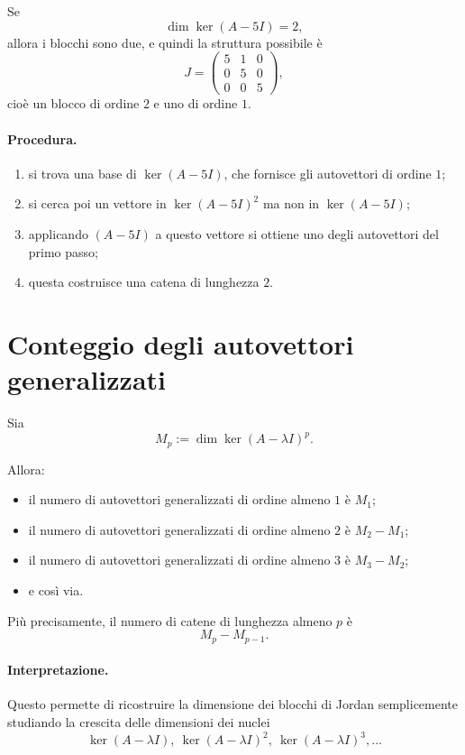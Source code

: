 Se
\[
\dim\ker(A-5I)=2,
\]
allora i blocchi sono due, e quindi la struttura possibile è
\[
J=
\begin{pmatrix}
5 & 1 & 0\\
0 & 5 & 0\\
0 & 0 & 5
\end{pmatrix},
\]
cioè un blocco di ordine $2$ e uno di ordine $1$.

\paragraph{Procedura.}
\begin{enumerate}
    \item si trova una base di $\ker(A-5I)$, che fornisce gli autovettori di ordine $1$;
    \item si cerca poi un vettore in $\ker(A-5I)^2$ ma non in $\ker(A-5I)$;
    \item applicando $(A-5I)$ a questo vettore si ottiene uno degli autovettori del primo passo;
    \item questa costruisce una catena di lunghezza $2$.
\end{enumerate}

\section{Conteggio degli autovettori generalizzati}

Sia
\[
M_p:=\dim\ker(A-\lambda I)^p.
\]

Allora:
\begin{itemize}
    \item il numero di autovettori generalizzati di ordine almeno $1$ è $M_1$;
    \item il numero di autovettori generalizzati di ordine almeno $2$ è $M_2-M_1$;
    \item il numero di autovettori generalizzati di ordine almeno $3$ è $M_3-M_2$;
    \item e così via.
\end{itemize}

Più precisamente, il numero di catene di lunghezza almeno $p$ è
\[
M_p-M_{p-1}.
\]

\paragraph{Interpretazione.}
Questo permette di ricostruire la dimensione dei blocchi di Jordan semplicemente studiando la crescita delle dimensioni dei nuclei
\[
\ker(A-\lambda I),\ \ker(A-\lambda I)^2,\ \ker(A-\lambda I)^3,\dots
\]

